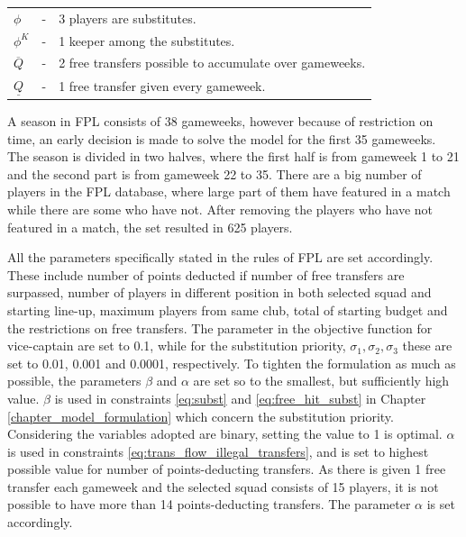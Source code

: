 \begin{table}[H]
\begin{tabular}{@{}lll@{}}
$\phi$                         & - & 3 players are substitutes.                                                         \\
$\phi^{K}$                   & - & 1 keeper among the substitutes.                                                          \\
$\overline{Q}$                   & - & 2 free transfers possible to accumulate over gameweeks.                                              \\
$\underline{Q}$                  & - & 1 free transfer given every gameweek.                                      \\ \bottomrule
\end{tabular}
\label{tab:initialization_of_parameters}
\end{table}

 
A season in FPL consists of 38 gameweeks, however because of restriction on time, an early decision is made to solve the model for the first 35 gameweeks. The season is divided in two halves, where the first half is from gameweek 1 to 21 and the second part is from gameweek 22 to 35. There are a big number of players in the FPL database, where large part of them have featured in a match while there are some who have not. After removing the players who have not featured in a match, the set resulted in 625 players. 

\newpar

All the parameters specifically stated in the rules of FPL are set accordingly. These include number of points deducted if number of free transfers are surpassed, number of players in different position in both selected squad and starting line-up, maximum players from same club, total of starting budget and the restrictions on free transfers. The parameter in the objective function for vice-captain are set to 0.1, while for the substitution priority, $\sigma_{1}, \sigma_{2}, \sigma_{3}$ these are set to 0.01, 0.001 and 0.0001, respectively. To tighten the formulation as much as possible, the parameters $\beta$ and $\alpha$ are set so to the smallest, but sufficiently high value. $\beta$ is used in constraints \eqref{eq:subst} and \eqref{eq:free_hit_subst} in Chapter \ref{chapter_model_formulation} which concern the substitution priority. Considering the variables adopted are binary, setting the value to 1 is optimal. $\alpha$ is used in constraints \eqref{eq:trans_flow_illegal_transfers}, and is set to highest possible value for number of points-deducting transfers. As there is given 1 free transfer each gameweek and the selected squad consists of 15 players, it is not possible to have more than 14 points-deducting transfers. The parameter $\alpha$ is set accordingly. 

